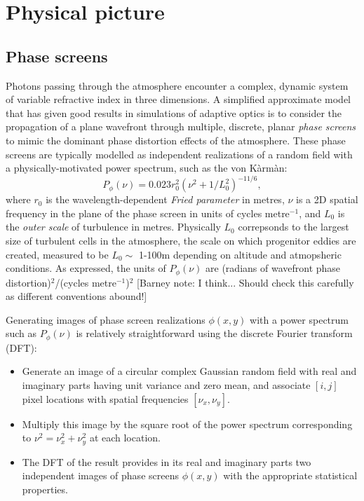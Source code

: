 \documentclass[preprint]{aastex}
\begin{document}
\section{Physical picture}
\subsection{Phase screens}
Photons passing through the atmosphere encounter a complex, dynamic
system of variable refractive index in three dimensions.  A simplified
approximate model that has given good results in simulations of adaptive
optics is to consider the propagation of a plane wavefront through
multiple, discrete, planar \emph{phase screens} to mimic the dominant phase
distortion effects of the atmosphere.  These phase screens are
typically modelled as independent realizations of a random field with
a physically-motivated power spectrum, such as the von K\`{a}rm\`{a}n:
\begin{equation}\label{eq:ps}
P_{\phi}(\nu) = 0.023 r_0^2 \left(\nu^2 + 1/L_0^2\right)^{-11/6},
\end{equation}
where $r_0$ is the wavelength-dependent \emph{Fried parameter} in metres, $\nu$
is a 2D spatial frequency in the plane of the phase screen in units of cycles metre$^{-1}$, and $L_0$ is
the \emph{outer scale} of turbulence in metres.  Physically $L_0$
correpsonds to the largest size of turbulent cells in the atmosphere,
the scale on which progenitor eddies are created, measured to be $L_0
\sim$ 1-100m depending on altitude and atmopsheric conditions.  As
expressed, the units of $P_{\phi}(\nu)$ are (radians of
wavefront phase distortion)$^2$/(cycles metre$^{-1}$)$^2$ [Barney note: I think... Should
check this carefully as different conventions abound!] 

Generating images of phase screen realizations $\phi(x, y)$ with a power spectrum such as
$P_{\phi}(\nu)$ is relatively straightforward using the discrete
Fourier transform (DFT):
\begin{itemize}
\item Generate an image of a circular complex Gaussian random field with real and imaginary
parts having unit variance and zero mean, and associate $[i, j]$ pixel
locations with spatial frequencies $[\nu_x, \nu_y]$.
\item Multiply this image by the square
root of the power spectrum corresponding to $\nu^2 = {\nu_x^2 + \nu_y^2}$ at each location.
\item The DFT of the result provides in its
real and imaginary parts two independent images of phase
screens $\phi(x, y)$ with the appropriate statistical properties.  
\end{itemize}
\end{document}

